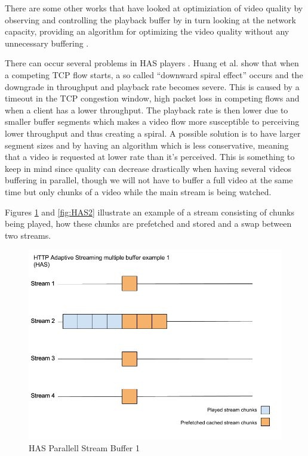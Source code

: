 There are some other works that have looked at optimiziation of video quality by observing and controlling the playback buffer by in turn looking at the network capacity, providing an algorithm for optimizing the video quality without any unnecessary buffering \cite{bufferbased}.


There can occur several problems in HAS players \cite{qualbranch}. Huang et al. \cite{streamrate} show that when a competing TCP flow starts, a so called “downward spiral effect” occurs and the downgrade in throughput and playback rate becomes severe. This is caused by a timeout in the TCP congestion window, high packet loss in competing flows and when a client has a lower throughput. The playback rate is then lower due to smaller buffer segments which makes a video flow more susceptible to perceiving lower throughput and thus creating a spiral. A possible solution is to have larger segment sizes and by having an algorithm which is less conservative, meaning that a video is requested at lower rate than it's perceived. This is something to keep in mind since quality can decrease drastically when having several videos buffering in parallel, though we will not have to buffer a full video at the same time but only chunks of a video while the main stream is being watched.

Figures \ref{fig:HAS1} and \ref{fig:HAS2} illustrate an example of a stream consisting of chunks being played, how these chunks are prefetched and stored and a swap between two streams.

\begin{figure}[!ht]
\begin{center}
\includegraphics[scale=0.4]{HAS1.png}
\caption{HAS Parallell Stream Buffer 1}
\label{fig:HAS1}
\end{center}
\end{figure}


